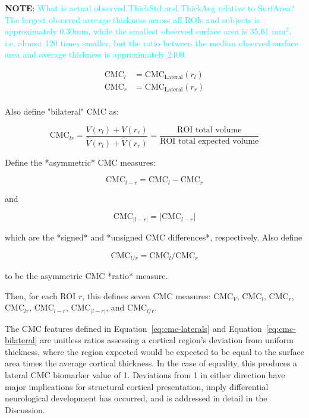 \documentclass{article}
\newcommand{\note}[2][cyan]{\textbf{NOTE}: \textcolor{#1}{#2}}
\begin{document}
\note{What is actual observed ThickStd and ThickAvg relative to SurfArea? The
largest observed average thickness across all ROIs and subjects is
approximately 0.30mm, while the smallest observed surface area is 35.61 mm\(^2\),
i.e. almost 120 times smaller, but the ratio between the median observed surface area and average thickness is approximately 2400.}





\begin{align*}
\label{eq:cmc-laterals}
\text{CMC}_l &= \text{CMC}_{\text{Lateral}}(r_l) \\
\text{CMC}_r &= \text{CMC}_{\text{Lateral}}(r_r) \\
\end{align*}

Also define "bilateral" CMC as:

\begin{equation}
\label{eq:cmc-bilateral}
\text{CMC}_{lr}
=\frac{V(r_l) + V(r_r)}{\hat{V}(r_l) + \hat{V}(r_r)}
=\frac{\text{ROI total volume}}{\text{ROI total expected volume}}
\end{equation}

Define the *asymmetric* CMC measures:

\[ \text{CMC}_{l - r} = \text{CMC}_{l} - \text{CMC}_{r} \] \label{eq:asym-signed-diff}

and

\[ \text{CMC}_{|l - r|} = \lvert\text{CMC}_{l - r} \rvert \] \label{eq:asym-unsigned-diff}

which are the *signed* and *unsigned CMC differences*, respectively. Also define

\[ \text{CMC}_{l / r} = \text{CMC}_{l} / \text{CMC}_{r} \] \label{eq:asym-ratio}

to be the asymmetric CMC *ratio* measure.

Then, for each ROI \(r\), this defines seven \(\text{CMC}\) measures:
\(\text{CMC}_{V}\), \(\text{CMC}_l\), \(\text{CMC}_r\), \(\text{CMC}_{lr}\),
\(\text{CMC}_{l-r}\), \(\text{CMC}_{\lvert l-r \rvert}\), and \(\text{CMC}_{l / r}\).

The CMC features defined in Equation~\ref{eq:cmc-laterals} and
Equation~\ref{eq:cmc-bilateral} are unitless ratios assessing a cortical
region's deviation from uniform thickness, where the region expected
would be expected to be equal to the surface area times the average cortical
thickness. In the case of equality, this produces a lateral CMC biomarker
value of 1. Deviations from 1 in either direction have major implications for
structural cortical presentation, imply differential neurological development
has occurred, and is addressed in detail in the Discussion.
\end{document}
